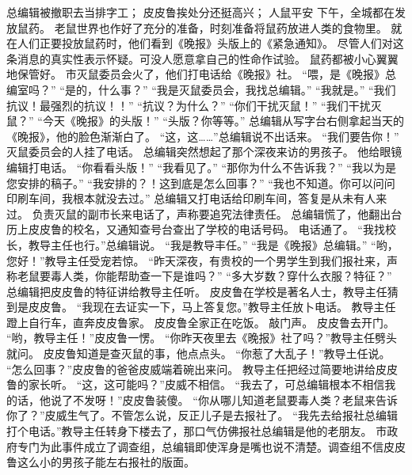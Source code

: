 \documentclass[a4paper,12pt,UTF8,twoside]{ctexbook}
\begin{document}
        总编辑被撤职去当排字工； 
        皮皮鲁挨处分还挺高兴； 
        人鼠平安   
        下午，全城都在发放鼠药。 
        老鼠世界也作好了充分的准备，时刻准备将鼠药放进人类的食物里。 
        就在人们正要投放鼠药时，他们看到《晚报》头版上的《紧急通知》。 
        尽管人们对这条消息的真实性表示怀疑。可没人愿意拿自己的性命作试验。 
        鼠药都被小心翼翼地保管好。 
        市灭鼠委员会火了，他们打电话给《晚报》社。 
        “喂，是《晚报》总编室吗？” 
        “是的，什么事？” 
        “我是灭鼠委员会，我找总编辑。” 
        “我就是。” 
        “我们抗议！最强烈的抗议！！” 
        “抗议？为什么？” 
        “你们干扰灭鼠！” 
        “我们干扰灭鼠？” 
        “今天《晚报》的头版！” 
        “头版？你等等。” 
        总编辑从写字台右侧拿起当天的《晚报》，他的脸色渐渐白了。 
        “这，这……”总编辑说不出话来。 
        “我们要告你！” 
        灭鼠委员会的人挂了电话。 
        总编辑突然想起了那个深夜来访的男孩子。 
        他给眼镜编辑打电话。 
        “你看看头版！” 
        “我看见了。” 
        “那你为什么不告诉我？” 
        “我以为是您安排的稿子。” 
        “我安排的？！这到底是怎么回事？” 
        “我也不知道。你可以问问印刷车间，我根本就没去过。” 
        总编辑又打电话给印刷车间，答复是从未有人来过。 
        负责灭鼠的副市长来电话了，声称要追究法律责任。 
        总编辑慌了，他翻出台历上皮皮鲁的校名，又通知查号台查出了学校的电话号码。 
        电话通了。 
        “我找校长，教导主任也行。”总编辑说。 
        “我是教导丰任。” 
        “我是《晚报》总编辑。” 
        “哟，您好！”教导主任受宠若惊。 
        “昨天深夜，有贵校的一个男学生到我们报社来，声称老鼠要毒人类，你能帮助查一下是谁吗？” 
        “多大岁数？穿什么衣服？特征？” 
        总编辑把皮皮鲁的特征讲给教导主任听。 
        皮皮鲁在学校是著名人士，教导主任猜到是皮皮鲁。 
        “我现在去证实一下，马上答复您。”教导主任放卜电话。 
        教导主任蹬上自行车，直奔皮皮鲁家。 
        皮皮鲁全家正在吃饭。 
        敲门声。 
        皮皮鲁去开门。 
        “哟，教导主任！”皮皮鲁一愣。 
        “你昨天夜里去《晚报》社了吗？”教导主任劈头就问。 
        皮皮鲁知道是查灭鼠的事，他点点头。 
        “你惹了大乱子！”教导土任说。 
        “怎么回事？”皮皮鲁的爸爸皮威端着碗出来问。 
        教导主任把经过简要地讲给皮皮鲁的家长听。 
        “这，这可能吗？”皮威不相信。 
        “我去了，可总编辑根本不相信我的话，他说了不发呀！”皮皮鲁装傻。 
        “你从哪儿知道老鼠要毒人类？老鼠来告诉你了？”皮威生气了。不管怎么说，反正儿子是去报社了。 
        “我先去给报社总编辑打个电话。”教导主任转身下楼去了，那口气仿佛报社总编辑是他的老朋友。 
        市政府专门为此事件成立了调查组，总编辑即使浑身是嘴也说不清楚。调查组不信皮皮鲁这么小的男孩子能左右报社的版面。 
\end{document}
